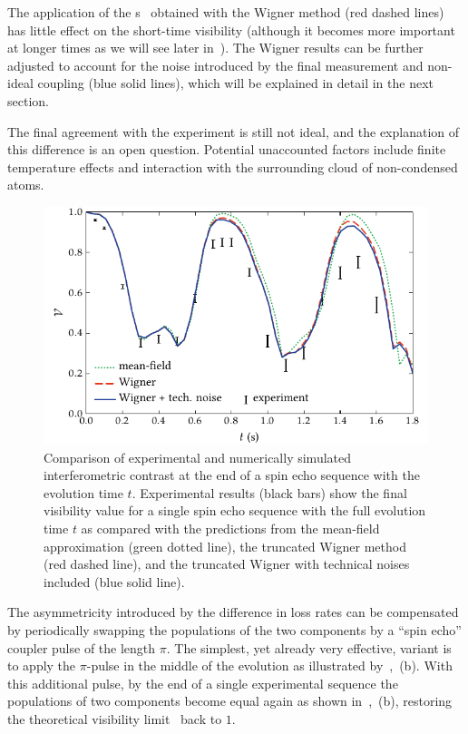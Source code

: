 The application of the s~ obtained with the Wigner method (red dashed lines) has little effect on the short-time visibility (although it becomes more important at longer times as we will see later in~).
The Wigner results can be further adjusted to account for the noise introduced by the final measurement and non-ideal coupling (blue solid lines), which will be explained in detail in the next section.

The final agreement with the experiment is still not ideal, and the explanation of this difference is an open question.
Potential unaccounted factors include finite temperature effects and interaction with the surrounding cloud of non-condensed atoms.

\begin{figure}
    \centerline{\includegraphics{figures_generated/bec_noise/echo_visibility_short.pdf}}

    \caption[Experimental and numerically simulated interferometric constrast in spin echo sequence]{
    Comparison of experimental and numerically simulated interferometric contrast at the end of a spin echo sequence with the evolution time $t$.
    Experimental results (black bars) show the final visibility value for a single spin echo sequence with the full evolution time $t$ as compared with the predictions from the mean-field approximation (green dotted line), the truncated Wigner method (red dashed line), and the truncated Wigner with technical noises included (blue solid line).}%

    \label{fig:bec-noise:visibility:echo-visibility}
\end{figure}

The asymmetricity introduced by the difference in loss rates can be compensated by periodically swapping the populations of the two components by a ``spin echo'' coupler pulse of the length $\pi$.
The simplest, yet already very effective, variant is to apply the $\pi$-pulse in the middle of the evolution as illustrated by~,~(b).
With this additional pulse, by the end of a single experimental sequence the populations of two components become equal again as shown in~,~(b), restoring the theoretical visibility limit~ back to $1$.

